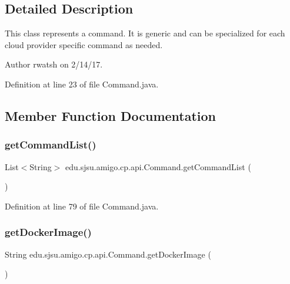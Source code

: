 \subsection{Detailed Description}
This class represents a command. It is generic and can be specialized for each cloud provider specific command as needed.

\begin{DoxyAuthor}{Author}
rwatsh on 2/14/17. 
\end{DoxyAuthor}


Definition at line 23 of file Command.\+java.



\subsection{Member Function Documentation}
\mbox{\label{classedu_1_1sjsu_1_1amigo_1_1cp_1_1api_1_1_command_ad02fe4992c2a9ce9616af6b7e7efd8b7}} 
\subsubsection{\texorpdfstring{get\+Command\+List()}{getCommandList()}}
{\footnotesize\ttfamily List$<$String$>$ edu.\+sjsu.\+amigo.\+cp.\+api.\+Command.\+get\+Command\+List (\begin{DoxyParamCaption}{ }\end{DoxyParamCaption})}



Definition at line 79 of file Command.\+java.

\mbox{\label{classedu_1_1sjsu_1_1amigo_1_1cp_1_1api_1_1_command_a48020511d6034df5b530b259a02897d5}} 
\subsubsection{\texorpdfstring{get\+Docker\+Image()}{getDockerImage()}}
{\footnotesize\ttfamily String edu.\+sjsu.\+amigo.\+cp.\+api.\+Command.\+get\+Docker\+Image (\begin{DoxyParamCaption}{ }\end{DoxyParamCaption})}




